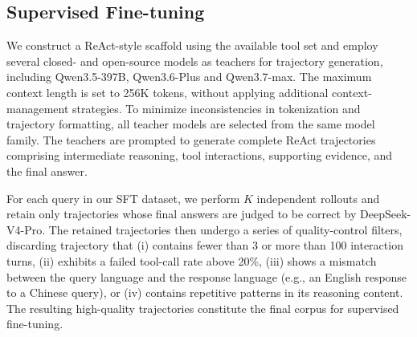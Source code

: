 \documentclass{huawei}
\begin{document}
\subsection{Supervised Fine-tuning}
We construct a ReAct-style scaffold using the available tool set and employ several closed- and open-source models as teachers for trajectory generation, including Qwen3.5-397B, Qwen3.6-Plus and Qwen3.7-max. The maximum context length is set to 256K tokens, without applying additional context-management strategies. To minimize inconsistencies in tokenization and trajectory formatting, all teacher models are selected from the same model family. The teachers are prompted to generate complete ReAct trajectories comprising intermediate reasoning, tool interactions, supporting evidence, and the final answer.

For each query in our SFT dataset, we perform $K$ independent rollouts and retain only trajectories whose final answers are judged to be correct by DeepSeek-V4-Pro.
The retained trajectories then undergo a series of quality-control filters, discarding trajectory that (i) contains fewer than 3 or more than 100 interaction turns, (ii) exhibits a failed tool-call rate above 20\%, (iii) shows a mismatch between the query language and the response language (e.g., an English response to a Chinese query), or (iv) contains repetitive patterns in its reasoning content. The resulting high-quality trajectories constitute the final corpus for supervised fine-tuning.




\end{document}
